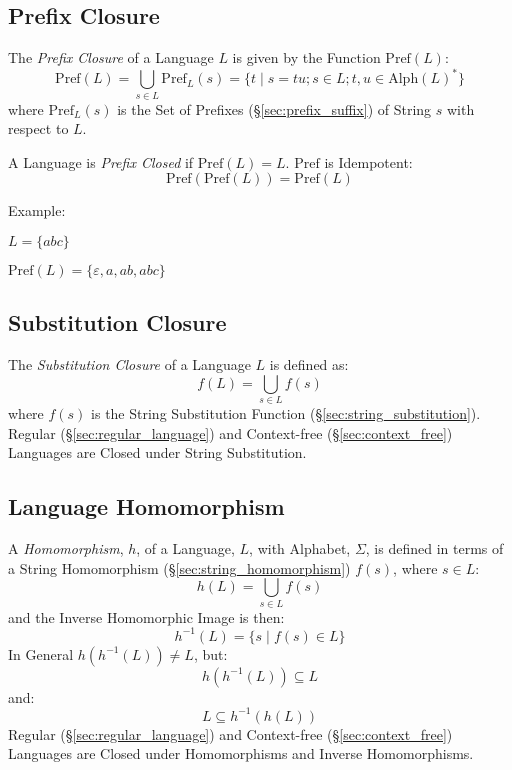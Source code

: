 \subsection{Prefix Closure}\label{sec:prefix_closure}

The \emph{Prefix Closure} of a Language $L$ is given by the Function
$\mathrm{Pref}(L)$:
\[
  \mathrm{Pref}(L) = \bigcup_{s \in L} \mathrm{Pref}_L(s) =
  \{ t\;|\;s = tu; s \in L; t,u \in \mathrm{Alph}(L)^* \}
\]
where $\mathrm{Pref}_L(s)$ is the Set of Prefixes
(\S\ref{sec:prefix_suffix}) of String $s$ with respect to $L$.

A Language is \emph{Prefix Closed} if $\mathrm{Pref}(L) = L$.
$\mathrm{Pref}$ is Idempotent:
\[
  \mathrm{Pref}(\mathrm{Pref}(L)) = \mathrm{Pref}(L)
\]

Example:

$L = \{abc\}$

$\mathrm{Pref}(L) = \{\varepsilon, a, ab, abc\}$



\subsection{Substitution Closure}\label{sec:substitution_closure}

The \emph{Substitution Closure} of a Language $L$ is defined as:
\[
  f(L) = \bigcup_{s \in L} f(s)
\]
where $f(s)$ is the String Substitution Function
(\S\ref{sec:string_substitution}). Regular
(\S\ref{sec:regular_language}) and Context-free
(\S\ref{sec:context_free}) Languages are Closed under String
Substitution.



\subsection{Language Homomorphism}\label{sec:language_homomorphism}

A \emph{Homomorphism}, $h$, of a Language, $L$, with Alphabet,
$\Sigma$, is defined in terms of a String Homomorphism
(\S\ref{sec:string_homomorphism}) $f(s)$, where $s \in L$:
\[
  h(L) = \bigcup_{s \in L} f(s)
\]
and the Inverse Homomorphic Image is then:
\[
  h^{-1}(L) = \{ s\;|\; f(s) \in L \}
\]
In General $h(h^{-1}(L)) \neq L$, but:
\[
  h (h^{-1}(L)) \subseteq L
\] and:
\[
  L \subseteq h^{-1}(h(L))
\]
Regular (\S\ref{sec:regular_language}) and Context-free
(\S\ref{sec:context_free}) Languages are Closed under Homomorphisms
and Inverse Homomorphisms.



